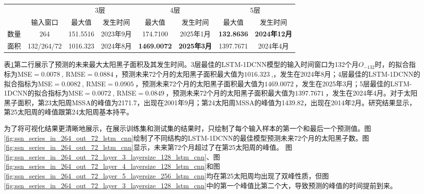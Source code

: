 \begin{table}[!htbp]
\centering
{}
\label{tab:ss_out_72}
\footnotesize
\begin{tabular}{cccccccc}
    \toprule
    &  & \multicolumn{2}{c}{3层} & \multicolumn{2}{c}{4层} & \multicolumn{2}{c}{5层}\\
    \cmidrule(lr){3-4} \cmidrule(lr){5-6} \cmidrule(lr){7-8}
    \noalign{\smallskip}
     & 输入窗口 & 最大值 & 发生时间 & 最大值 & 发生时间 & 最大值 & 发生时间 \\
    \midrule
    数量 & 264 & 151.5516 & 2023年9月 & 174.7100 & 2025年1月 & \textbf{132.8636} & \textbf{2024年12月} \\
    面积 & 132/264/72 & 1016.323 & 2024年8月 & \textbf{1469.0072} & \textbf{2025年3月} & 1397.7671 & 2024年4月 \\
    \bottomrule
\end{tabular}
\end{table}

表\ref{tab:ss_out_72}第二行展示了预测的未来最大太阳黑子面积及其发生时间。3层最佳的LSTM-1DCNN模型的输入时间窗口为132个月$O_{-132}$时，的拟合指标为MSE$=\SI{0.0078}{}$, RMSE$=\SI{0.0884}{}$，预测未来72个月的太阳黑子面积最大值为$\SI{1016.323}{}$,，发生在2024年8月；4层最佳的LSTM-1DCNN的拟合指标为MSE$=\SI{0.0082}{}$, RMSE$=\SI{0.0905}{}$，预测未来72个月的太阳黑子面积最大值为$\SI{1469.0072}{}$，发生在2025年3月；5层最佳的LSTM-1DCNN的拟合指标为MSE$=\SI{0.0072}{}$, RMSE$=\SI{0.0849}{}$，预测未来72个月的太阳黑子面积最大值为$\SI{1397.7671}{}$，发生在2024年4月。对于太阳黑子面积，第23太阳周MSSA的峰值为2171.7，出现在2001年9月；第24太阳周MSSA的峰值为1439.82，出现在2014年2月。研究结果显示，第25太阳周的峰值跟第24太阳周基本持平。 

为了将可视化结果更清晰地展示，在展示训练集和测试集的结果时，只绘制了每个输入样本的第一个和最后一个预测值。图\ref{fig:ssn_series_in_264_out_72_lstm_cnn}绘制了不同结构的LSTM-1DCNN的最佳模型预测未来72个月的太阳黑子数。图\ref{fig:ssn_series_in_264_out_72_lstm_cnn}显示，未来第72个月超过了在第25太阳周的峰值。
图\ref{fig:ssn_series_in_264_out_72_layer_3_layersize_128_lstm_cnn}、图\ref{fig:ssn_series_in_264_out_72_layer_4_layersize_128_lstm_cnn}和图\ref{fig:ssn_series_in_264_out_72_layer_5_layersize_256_lstm_cnn}均在第25太阳周均出现了双峰性质，但图\ref{fig:ssn_series_in_264_out_72_layer_3_layersize_128_lstm_cnn}中的第一个峰值比第二个大，导致预测的峰值的时间提前到来。


